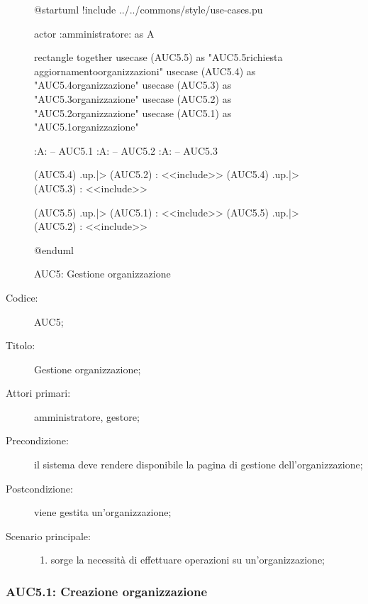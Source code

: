 \documentclass[../../../analisi-dei-requisiti.tex]{subfiles}
\begin{document}
\begin{figure}[H]
  \centering
  \begin{plantuml}
    @startuml
    !include ../../commons/style/use-cases.pu

    actor :amministratore: as A

    rectangle {
        together {
            usecase (AUC5.5) as "AUC5.5\nInvio richiesta aggiornamento\nlista organizzazioni"
            usecase (AUC5.4) as "AUC5.4\nSeleziona organizzazione"
            usecase (AUC5.3) as "AUC5.3\nModifica organizzazione"
            usecase (AUC5.2) as "AUC5.2\nEliminazione organizzazione"
            usecase (AUC5.1) as "AUC5.1\nCreazione organizzazione"
          }
      }

    :A: -- AUC5.1
    :A: -- AUC5.2
    :A: -- AUC5.3

    (AUC5.4) .up.|> (AUC5.2) : <<include>>
    (AUC5.4) .up.|> (AUC5.3) : <<include>>

    (AUC5.5) .up.|> (AUC5.1) : <<include>>
    (AUC5.5) .up.|> (AUC5.2) : <<include>>

    @enduml
  \end{plantuml}
  \caption{AUC5: Gestione organizzazione}%
  \label{fig:AUC5}
\end{figure}

\begin{description}
  \item[Codice:] AUC5;
  \item[Titolo:] Gestione organizzazione;
  \item[Attori primari:] amministratore, gestore;
  \item[Precondizione:] il sistema deve rendere disponibile la pagina di gestione dell'organizzazione;
  \item[Postcondizione:] viene gestita un'organizzazione;
  \item[Scenario principale:]
        \begin{enumerate}
          \item sorge la necessità di effettuare operazioni su un'organizzazione;
        \end{enumerate}
\end{description}

\subsubsection{AUC5.1: Creazione organizzazione}%
\label{subs:AUC5.1}
\end{document}
